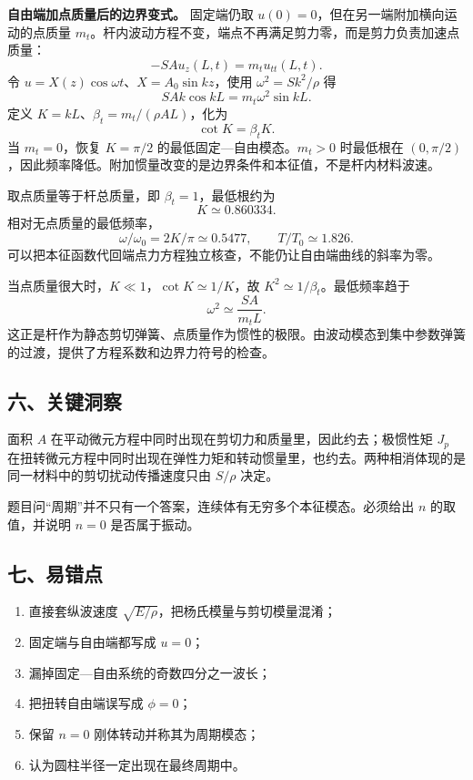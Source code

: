 \documentclass[12pt,a4paper,UTF8]{ctexart}
\newcommand{\tightlist}{\setlength{\itemsep}{0pt}\setlength{\parskip}{0pt}}
\begin{document}
\textbf{自由端加点质量后的边界变式。} 固定端仍取
\(u(0)=0\)，但在另一端附加横向运动的点质量
\(m_t\)。杆内波动方程不变，端点不再满足剪力零，而是剪力负责加速点质量：
\[
-SA u_z(L,t)=m_tu_{tt}(L,t).
\] 令 \(u=X(z)\cos\omega t\)、\(X=A_0\sin kz\)，使用
\(\omega^2=Sk^2/\rho\) 得 \[
SAk\cos kL=m_t\omega^2\sin kL.
\] 定义 \(K=kL\)、\(\beta_t=m_t/(\rho AL)\)，化为 \[
\cot K=\beta_tK.
\] 当 \(m_t=0\)，恢复 \(K=\pi/2\) 的最低固定---自由模态。\(m_t>0\)
时最低根在
\((0,\pi/2)\)，因此频率降低。附加惯量改变的是边界条件和本征值，不是杆内材料波速。

取点质量等于杆总质量，即 \(\beta_t=1\)，最低根约为 \[
K\simeq0.860334.
\] 相对无点质量的最低频率， \[
\omega/\omega_0=2K/\pi\simeq0.5477,
\qquad T/T_0\simeq1.826.
\] 可以把本征函数代回端点力方程独立核查，不能仍让自由端曲线的斜率为零。

当点质量很大时，\(K\ll1\)，\(\cot K\simeq1/K\)，故
\(K^2\simeq1/\beta_t\)。最低频率趋于 \[
\omega^2\simeq\frac{SA}{m_tL}.
\]
这正是杆作为静态剪切弹簧、点质量作为惯性的极限。由波动模态到集中参数弹簧的过渡，提供了方程系数和边界力符号的检查。

\subsection{六、关键洞察}\label{ux516dux5173ux952eux6d1eux5bdf-2}

面积 \(A\) 在平动微元方程中同时出现在剪切力和质量里，因此约去；极惯性矩
\(J_p\)
在扭转微元方程中同时出现在弹性力矩和转动惯量里，也约去。两种相消体现的是同一材料中的剪切扰动传播速度只由
\(S/\rho\) 决定。

题目问``周期''并不只有一个答案，连续体有无穷多个本征模态。必须给出 \(n\)
的取值，并说明 \(n=0\) 是否属于振动。

\subsection{七、易错点}\label{ux4e03ux6613ux9519ux70b9-2}

\begin{enumerate}
\def\labelenumi{\arabic{enumi}.}
\tightlist
\item
  直接套纵波速度 \(\sqrt{E/\rho}\)，把杨氏模量与剪切模量混淆；
\item
  固定端与自由端都写成 \(u=0\)；
\item
  漏掉固定---自由系统的奇数四分之一波长；
\item
  把扭转自由端误写成 \(\phi=0\)；
\item
  保留 \(n=0\) 刚体转动并称其为周期模态；
\item
  认为圆柱半径一定出现在最终周期中。
\end{enumerate}
\end{document}
